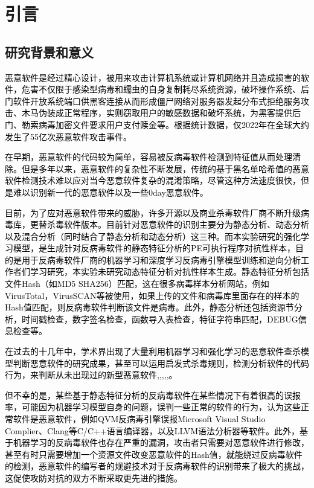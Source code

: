 
\chapter{引言}

\section{研究背景和意义}

\textcolor{black}{恶意软件是经过精心设计，被用来攻击计算机系统或计算机网络并且造成损害的软件，危害不仅限于感染型病毒和蠕虫的自身复制耗尽系统资源，破坏操作系统、后门软件开放系统端口供黑客连接从而形成僵尸网络对服务器发起分布式拒绝服务攻击、木马伪装成正常程序，实则窃取用户的敏感数据和破坏系统，为黑客提供后门、勒索病毒加密文件要求用户支付赎金等。根据统计数据，仅2022年在全球大约发生了55亿次恶意软件攻击事件\parencite{ref1}。}

\textcolor{black}{在早期，恶意软件的代码较为简单，容易被反病毒软件检测到特征值从而处理清除。但是多年以来，恶意软件的复杂性不断发展，传统的基于黑名单哈希值的恶意软件检测技术难以应对当今恶意软件复杂的混淆策略，尽管这种方法速度很快，但是难以识别新一代的恶意软件以及一些0day恶意软件\parencite{ref2}。}

\textcolor{black}{目前，为了应对恶意软件带来的威胁，许多开源以及商业杀毒软件厂商不断升级病毒库，更替杀毒软件版本。目前针对恶意软件的识别主要分为静态分析、动态分析以及混合分析（同时结合了静态分析和动态分析）这三种。而本实验研究的强化学习模型，是生成针对反病毒软件的静态特征分析的PE可执行程序对抗性样本，目的是用于反病毒软件厂商的机器学习和深度学习反病毒引擎模型训练和逆向分析工作者们学习研究，本实验未研究动态特征分析对抗性样本生成。静态特征分析包括文件Hash（如MD5 SHA256）匹配，这在很多病毒样本分析网站，例如VirusTotal，VirusSCAN等被使用，如果上传的文件和病毒库里面存在的样本的Hash值匹配，则反病毒软件判断该文件是病毒。此外，静态分析还包括资源节分析，时间戳检查，数字签名检查，函数导入表检查，特征字符串匹配，DEBUG信息检查等。}

\textcolor{black}{在过去的十几年中，学术界出现了大量利用机器学习和强化学习的恶意软件查杀模型判断恶意软件的研究成果，甚至可以运用启发式杀毒规则，检测分析软件的代码行为，来判断从未出现过的新型恶意软件\parencite{ref3},\parencite{ref4},\parencite{ref5},\parencite{ref6},\parencite{ref7},\parencite{ref8}。}

\textcolor{black}{但不幸的是，某些基于静态特征分析的反病毒软件在某些情况下有着很高的误报率，可能因为机器学习模型自身的问题，误判一些正常的软件的行为，认为这些正常软件是恶意软件，例如QVM反病毒引擎误报Microsoft Visual Studio Complier、Clang等C/C++语言编译器，以及LLVM语法分析器等软件。此外，基于机器学习的反病毒软件也存在严重的漏洞，攻击者只需要对恶意软件进行修改，甚至有时只需要增加一个资源文件改变恶意软件的Hash值，就能绕过反病毒软件的检测，恶意软件的编写者的规避技术对于反病毒软件的识别带来了极大的挑战，这促使攻防对抗的双方不断采取更先进的措施。}

